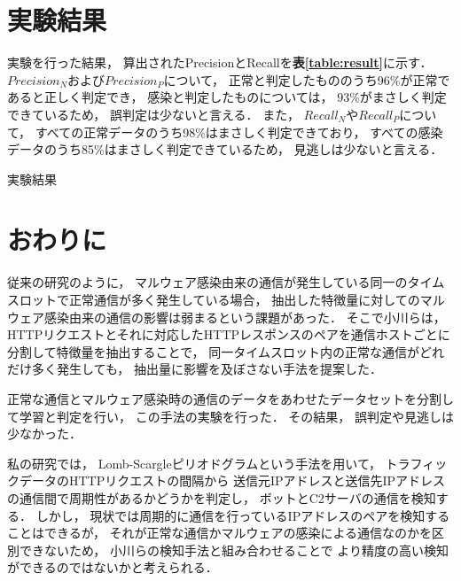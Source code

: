 \documentclass[twocolumn,10pt]{ltjsarticle}
\begin{document}
\section{実験結果}
実験を行った結果， 算出されたPrecisionとRecallを\textbf{表\ref{table:result}}に示す． 
$Precision_N$および$Precision_P$について， 正常と判定したもののうち96\%が正常であると正しく判定でき， 
感染と判定したものについては， 93\%がまさしく判定できているため， 誤判定は少ないと言える． 
また， $Recall_N$や$Recall_P$について， すべての正常データのうち98\%はまさしく判定できており， 
すべての感染データのうち85\%はまさしく判定できているため， 見逃しは少ないと言える． 

\begin{table}[htb]
    \caption{実験結果}
    \label{table:result}
    \centering
\end{table}

\section{おわりに}
従来の研究のように， マルウェア感染由来の通信が発生している同一のタイムスロットで正常通信が多く発生している場合， 
抽出した特徴量に対してのマルウェア感染由来の通信の影響は弱まるという課題があった． 
そこで小川らは， HTTPリクエストとそれに対応したHTTPレスポンスのペアを通信ホストごとに分割して特徴量を抽出することで， 
同一タイムスロット内の正常な通信がどれだけ多く発生しても， 抽出量に影響を及ぼさない手法を提案した． \par
正常な通信とマルウェア感染時の通信のデータをあわせたデータセットを分割して学習と判定を行い， この手法の実験を行った． 
その結果， 誤判定や見逃しは少なかった． \par
私の研究では， Lomb-Scargleピリオドグラムという手法を用いて， トラフィックデータのHTTPリクエストの間隔から
送信元IPアドレスと送信先IPアドレスの通信間で周期性があるかどうかを判定し， ボットとC2サーバの通信を検知する． 
しかし， 現状では周期的に通信を行っているIPアドレスのペアを検知することはできるが， 
それが正常な通信かマルウェアの感染による通信なのかを区別できないため， 小川らの検知手法と組み合わせることで
より精度の高い検知ができるのではないかと考えられる． 




\end{document}
